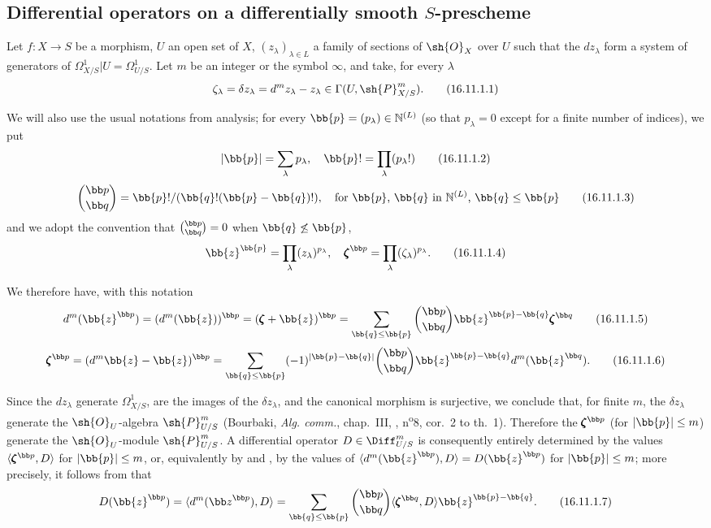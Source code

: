 \subsection{Differential operators on a differentially smooth $S$-prescheme}
\label{IV.16.11}

\begin{env}[16.11.1]
\label{IV.16.11.1}
Let $f:X \to S$ be a morphism, $U$ an open set of $X$, $(z_\lambda)_{\lambda \in L}$ a family of sections of $\sh{O}_X$ over $U$ such that the $dz_\lambda$ form a system of generators of $\Omega_{X/S}^1|U = \Omega_{U/S}^1$.
Let $m$ be an integer or the symbol $\infty$, and take, for every $\lambda$
\[
  \label{IV.16.11.1.1}
  \zeta_\lambda = \delta z_\lambda = d^m z_\lambda - z_\lambda \in \Gamma(U, \sh{P}_{X/S}^m).
  \tag{16.11.1.1}
\]

We will also use the usual notations from analysis;
for every $\bb{p} = (p_\lambda) \in \mathbb{N}^{(L)}$ (so that $p_\lambda = 0$ except for a finite number of indices), we put
\[
  \label{IV.16.11.1.2}
  |\bb{p}| = \sum_\lambda p_\lambda, \quad \bb{p}! = \prod_\lambda (p_\lambda!)
  \tag{16.11.1.2}
\]
\[
  \label{IV.16.11.1.3}
  \binom{\bb p}{\bb q} = \bb{p}!/(\bb{q}!(\bb{p} - \bb{q})!), \quad \text{for $\bb{p}$, $\bb{q}$ in $\mathbb{N}^{(L)}$, $\bb{q} \leq \bb{p}$}
  \tag{16.11.1.3}
\]
and we adopt the convention that $\binom{\bb p}{\bb q} = 0$ when $\bb{q} \not\leq \bb{p}$,
\[
  \label{IV.16.11.1.4}
  \bb{z}^\bb{p} = \prod_\lambda (z_\lambda)^{p_\lambda}, \quad {\pmb\zeta}^{\bb p} = \prod_\lambda (\zeta_\lambda)^{p_\lambda}.
  \tag{16.11.1.4}
\]

We therefore have, with this notation
\[
  \label{IV.16.11.1.5}
  d^m(\bb{z}^{\bb p}) = (d^m(\bb{z}))^{\bb p} = (\pmb{\zeta} + \bb{z})^{\bb p} = \sum_{\bb{q} \leq \bb{p}} \binom{\bb p}{\bb q} \bb{z}^{\bb{p} - \bb{q}} \pmb{\zeta}^{\bb q}
  \tag{16.11.1.5}
\]
\[
  \label{IV.16.11.1.6}
  \pmb{\zeta}^{\bb p} = (d^m \bb{z} - \bb{z})^{\bb p} =  \sum_{\bb{q} \leq \bb{p}} (-1)^{|\bb{p} - \bb{q}|} \binom{\bb p}{\bb q} \bb{z}^{\bb{p} - \bb{q}} d^m(\bb{z}^{\bb q}).
  \tag{16.11.1.6}
\]
  
Since the $dz_\lambda$ generate $\Omega_{X/S}^1$, are the images of the $\delta z_\lambda$, and the canonical morphism  is surjective, we conclude that, for finite $m$, the $\delta z_\lambda$ generate the $\sh{O}_U$-algebra $\sh{P}_{U/S}^m$ (Bourbaki, \emph{Alg. comm.}, chap.~III, , n\textsuperscript{o}8, cor.\ 2 to th.\ 1).
Therefore the $\pmb{\zeta}^{\bb p}$ (for $|\bb{p}| \leq m$) generate the $\sh{O}_U$-module $\sh{P}_{U/S}^m$.
A differential operator $D \in \Diff_{U/S}^m$ is consequently entirely determined by the values $\langle \pmb{\zeta}^{\bb p}, D \rangle$ for $|\bb{p}| \leq m$, or, equivalently by  and , by the values
of $\langle d^m(\bb{z}^{\bb p}), D \rangle = D(\bb{z}^{\bb p})$ for $|\bb{p}| \leq m$;
more precisely, it follows from  that
\[
  \label{IV.16.11.1.7}
  D(\bb{z}^{\bb p}) = \langle d^m({\bb z}^{\bb p}), D \rangle = \sum_{\bb{q} \leq \bb{p}} \binom{\bb p}{\bb q} \langle \pmb{\zeta}^{\bb q} , D \rangle \bb{z}^{\bb{p} - \bb{q}}.
  \tag{16.11.1.7}
\]
\end{env}

